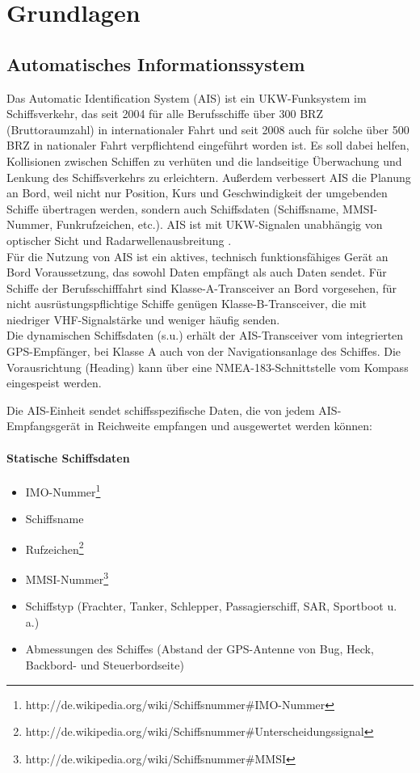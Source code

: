 \chapter{Grundlagen}\label{s.Grundlagen}
\section{Automatisches Informationssystem}\label{s.Automatisches Informationssystem (AIS)}
Das Automatic Identification System (AIS) ist ein UKW-Funksystem im Schiffsverkehr, das seit 2004 für alle Berufsschiffe über 300 BRZ (Bruttoraumzahl) in internationaler Fahrt und seit 2008 auch für solche über 500 BRZ in nationaler Fahrt verpflichtend eingeführt worden ist. Es soll dabei helfen, Kollisionen zwischen Schiffen zu verhüten und die landseitige Überwachung und Lenkung des Schiffsverkehrs zu erleichtern. Außerdem verbessert AIS die Planung an Bord, weil nicht nur Position, Kurs und Geschwindigkeit der umgebenden Schiffe übertragen werden, sondern auch Schiffsdaten (Schiffsname, MMSI-Nummer, Funkrufzeichen, etc.). AIS ist mit UKW-Signalen unabhängig von optischer Sicht und Radarwellenausbreitung \cite{wiki:ais}.\\
Für die Nutzung von AIS ist ein aktives, technisch funktionsfähiges Gerät an Bord Voraussetzung, das sowohl Daten empfängt als auch Daten sendet. Für Schiffe der Berufsschifffahrt sind Klasse-A-Transceiver an Bord vorgesehen, für nicht ausrüstungspflichtige Schiffe genügen Klasse-B-Transceiver, die mit niedriger VHF-Signalstärke und weniger häufig senden.  \\
Die dynamischen Schiffsdaten (s.u.) erhält der AIS-Transceiver vom integrierten GPS-Empfänger, bei Klasse A auch von der Navigationsanlage des Schiffes. Die Vorausrichtung (Heading) kann über eine NMEA-183-Schnittstelle vom Kompass eingespeist werden.

Die AIS-Einheit sendet schiffsspezifische Daten, die von jedem AIS-Empfangsgerät in Reichweite empfangen und ausgewertet werden können:
\subsubsection{Statische Schiffsdaten} \label{Statische Schiffsdaten}
\begin{itemize}
\item IMO-Nummer\footnote{http://de.wikipedia.org/wiki/Schiffsnummer\#IMO-Nummer}
\item Schiffsname
\item Rufzeichen\footnote{http://de.wikipedia.org/wiki/Schiffsnummer\#Unterscheidungssignal}
\item MMSI-Nummer\footnote{http://de.wikipedia.org/wiki/Schiffsnummer\#MMSI}
\item Schiffstyp (Frachter, Tanker, Schlepper, Passagierschiff, SAR, Sportboot u. a.)
\item Abmessungen des Schiffes (Abstand der GPS-Antenne von Bug, Heck, Backbord- und Steuerbordseite)
\end{itemize}

